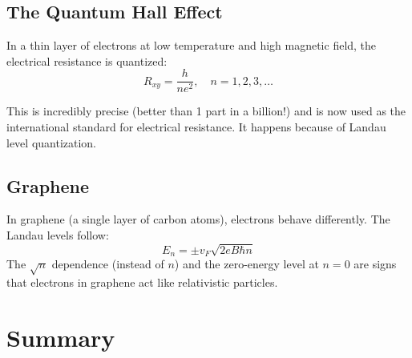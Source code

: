 \documentclass[11pt,a4paper]{article}
\let\oldsection\section
\renewcommand{\section}{\needspace{5\baselineskip}\oldsection}
\let\oldsubsection\subsection
\renewcommand{\subsection}{\needspace{4\baselineskip}\oldsubsection}
\theoremstyle{definition}
\theoremstyle{remark}
\begin{document}
\subsection{The Quantum Hall Effect}

 In a thin layer of electrons at low temperature and high magnetic field, the electrical resistance is quantized:
\begin{equation}
    R_{xy} = \frac{h}{ne^2}, \quad n = 1, 2, 3, \ldots
\end{equation}

This is incredibly precise (better than 1 part in a billion!) and is now used as the international standard for electrical resistance. It happens because of Landau level quantization.

\subsection{Graphene}

In graphene (a single layer of carbon atoms), electrons behave differently. The Landau levels follow:
\begin{equation}
    E_n = \pm v_F \sqrt{2eB\hbar n}
\end{equation}
The $\sqrt{n}$ dependence (instead of $n$) and the zero-energy level at $n=0$ are signs that electrons in graphene act like relativistic particles.

\section{Summary}
\end{document}
